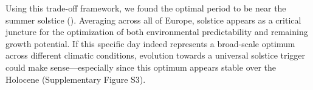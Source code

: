 \documentclass[11pt,letter]{article}
\begin{document}
Using this trade-off framework, we found the optimal period to be near the summer solstice (). Averaging across all of Europe, solstice appears as a critical juncture for the optimization of both environmental predictability and remaining growth potential.
If this specific day indeed represents a broad-scale optimum across different climatic conditions, evolution towards a universal solstice trigger could make sense---especially since this optimum appears stable over the Holocene (Supplementary Figure S3). %
\end{document}
